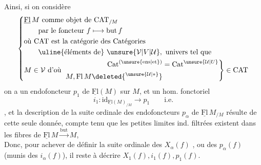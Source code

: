 Ainsi, si on considère
\[
\left\{\begin{aligned}
&\underline{\mathrm{Fl}}\,M\text{ comme objet de }\mathrm{CAT}_{/M}\\
&\qquad\text{par le foncteur }f\longmapsto\operatorname{but}f\\
&\text{où }\mathrm{CAT}\text{ est la catégorie des Catégories}\\
&\qquad\text{\uline{éléments de} }\unsure{\mathcal V|V|\mathcal U},\text{ univers tel que}\\
&M\in\mathcal V\text{ d'où }\left.\begin{aligned}\mathrm{Cat}^{(\unsure{\mathrm{ens}|\mathrm{et}})}&=\mathrm{Cat}^{\unsure{\mathcal U|U}}\\M,\mathrm{Fl}\,M\deleted{^{\unsure{\mathcal U|*}}}&\end{aligned}\right\}\in\mathrm{CAT}
\end{aligned}\right.
\]
on a un endofoncteur $p_1$ de $\underline{\mathrm{Fl}}(M)$ sur $M$, et un hom. fonctoriel
\[i_1:\mathrm{id}_{\underline{\mathrm{Fl}}(M)_{/M}}\longrightarrow p_1\qquad\text{i.e.}\tag*{1.13.}\]
, et la description de la suite ordinale des endofoncteurs $p_\alpha$ de $\underline{\mathrm{Fl}}\,M_{/M}$ résulte de cette seule donnée, compte tenu que les petites limites ind. filtrées existent dans les fibres de $\underline{\mathrm{Fl}}\,M\xrightarrow{\operatorname{but}}M$, 
\[\tag*{(1.14.)}\]
Donc, pour achever de définir la suite ordinale des $X_\alpha(f)$ , ou des $p_\alpha(f)$ (munis des $i_\alpha(f)$), il reste à décrire $X_1(f),i_1(f),p_1(f)$.

